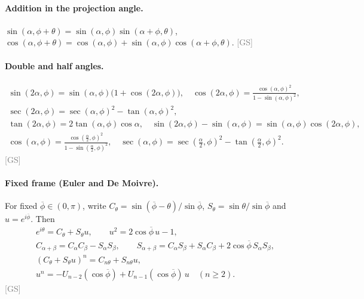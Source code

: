 \documentclass[11pt]{article}
\newcommand{\pb}{\overline{\phi}}
\newcommand{\src}[1]{\hfill{\small\textcolor{gray}{[#1]}}}
\begin{document}
\paragraph{Addition in the projection angle.}
$\sin(\alpha,\phi+\theta) = \sin(\alpha,\phi)\sin(\alpha+\phi,\theta)$,\quad
$\cos(\alpha,\phi+\theta) = \cos(\alpha,\phi) + \sin(\alpha,\phi)\cos(\alpha+\phi,\theta)$. \src{GS}

\paragraph{Double and half angles.}
\begin{gather*}
\sin(2\alpha,\phi) = \sin(\alpha,\phi)\bigl(1+\cos(2\alpha,\phi)\bigr),\quad
\cos(2\alpha,\phi) = \frac{\cos(\alpha,\phi)^2}{1-\sin(\alpha,\phi)^2},\\
\sec(2\alpha,\phi) = \sec(\alpha,\phi)^2 - \tan(\alpha,\phi)^2,\\
\tan(2\alpha,\phi) = 2\tan(\alpha,\phi)\cos\alpha,\quad
\sin(2\alpha,\phi)-\sin(\alpha,\phi) = \sin(\alpha,\phi)\cos(2\alpha,\phi),\\
\cos(\alpha,\phi) = \frac{\cos(\frac\alpha2,\phi)^2}{1-\sin(\frac\alpha2,\phi)^2},\quad
\sec(\alpha,\phi) = \sec(\tfrac\alpha2,\phi)^2 - \tan(\tfrac\alpha2,\phi)^2 .
\end{gather*}
\src{GS}

\paragraph{Fixed frame (Euler and De Moivre).} For fixed $\pb\in(0,\pi)$, write
$C_\theta = \sin(\pb-\theta)/\sin\pb$, $S_\theta = \sin\theta/\sin\pb$ and $u = e^{i\pb}$. Then
\begin{gather*}
e^{i\theta} = C_\theta + S_\theta u,\qquad u^2 = 2\cos\pb\,u - 1,\\
C_{\alpha+\beta} = C_\alpha C_\beta - S_\alpha S_\beta,\qquad
S_{\alpha+\beta} = C_\alpha S_\beta + S_\alpha C_\beta + 2\cos\pb\,S_\alpha S_\beta,\\
(C_\theta + S_\theta u)^n = C_{n\theta} + S_{n\theta}u,\\
u^n = -U_{n-2}(\cos\pb) + U_{n-1}(\cos\pb)\,u\quad(n\ge 2).
\end{gather*}
\src{GS}
\end{document}
